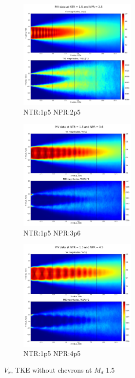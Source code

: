 \begin{figure}[H]
\begin{subfigure}{.5\textwidth}
	\centering
	\includegraphics[width=2.3in]{images/PIV_NTR1p5_NPR2p5.png}
	\caption{NTR:1p5 NPR:2p5 }
	\label{fig:setup1}
\end{subfigure}%
\begin{subfigure}{.5\textwidth}
	\centering
	\includegraphics[width=2.3in]{images/PIV_NTR1p5_NPR3p6.png}
	\caption{NTR:1p5 NPR:3p6 }
	\label{fig:setup2}
\end{subfigure}
\begin{subfigure}{1.0\textwidth}
	\centering
	\includegraphics[width=2.3in]{images/PIV_NTR1p5_NPR4p5.png}
	\caption{NTR:1p5 NPR:4p5 }
	\label{fig:setup2}
\end{subfigure}
\caption{$V_x$, TKE without chevrons at $M_d$ 1.5 }
\label{fig:2dplots}
\end{figure}

